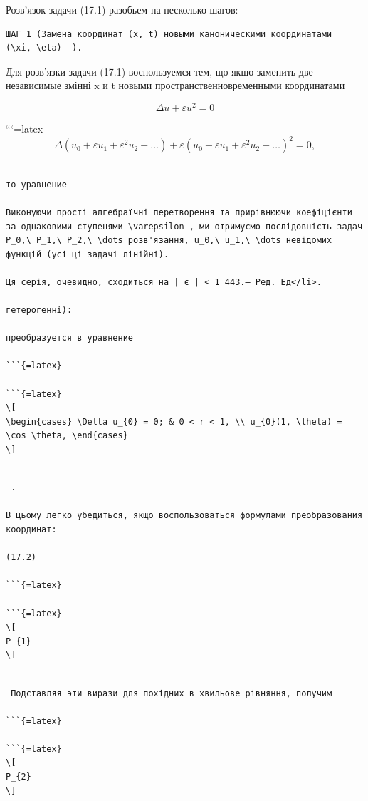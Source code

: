 \documentclass[
  ukrainian,
]{article}
\begin{document}
Розв'язок задачи (17.1) разобьем на несколько шагов:

\begin{verbatim}
ШАГ 1 (Замена координат (x, t) новыми каноническими координатами  (\xi, \eta)  ).
\end{verbatim}

Для розв'язки задачи (17.1) воспользуемся тем, що якщо заменить две
независимые змінні x и t новыми пространственновременными координатами

\[
\Delta u + \varepsilon u^2 = 0
\]

```{=latex}
\[
\Delta (u_0 + \varepsilon u_1 + \varepsilon^2 u_2 + \ldots) + \varepsilon (u_0 + \varepsilon u_1 + \varepsilon^2 u_2 + \ldots)^2 = 0,
\]

\begin{verbatim}

то уравнение

Виконуючи прості алгебраїчні перетворення та прирівнюючи коефіцієнти за однаковими ступенями \varepsilon , ми отримуємо послідовність задач P_0,\ P_1,\ P_2,\ \dots розв'язання, u_0,\ u_1,\ \dots невідомих функцій (усі ці задачі лінійні).

Ця серія, очевидно, сходиться на | є | < 1 443.— Ред. Ед</li>.

гетерогенні):

преобразуется в уравнение

```{=latex}

```{=latex}
\[
\begin{cases} \Delta u_{0} = 0; & 0 < r < 1, \\ u_{0}(1, \theta) = \cos \theta, \end{cases}
\]
\end{verbatim}

\begin{verbatim}

 .

В цьому легко убедиться, якщо воспользоваться формулами преобразования координат:

(17.2)

```{=latex}

```{=latex}
\[
P_{1}
\]
\end{verbatim}

\begin{verbatim}

 Подставляя эти вирази для похідних в хвильове рівняння, получим

```{=latex}

```{=latex}
\[
P_{2}
\]
\end{verbatim}
\end{document}

